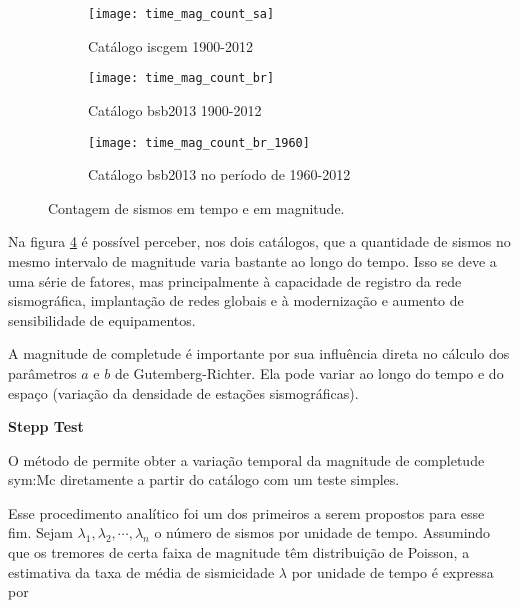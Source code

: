 \begin{figure}[H]
	  \centering
	  \begin{subfigure}[b]{0.7\textwidth}
		  	\centering
			\texttt{[image: time\_mag\_count\_sa]}
			\caption{Catálogo \gls{iscgem} 1900-2012}
			\label{fig:tmf_sa}
        \end{subfigure}%

	  \begin{subfigure}[b]{0.7\textwidth}
		  	\centering
  			\texttt{[image: time\_mag\_count\_br]}
			\caption{Catálogo \gls{bsb2013} 1900-2012}
			\label{fig:tmf_br}
       \end{subfigure}%

	   \begin{subfigure}[b]{0.7\textwidth}
		  	\centering
  			\texttt{[image: time\_mag\_count\_br\_1960]}
			\caption{Catálogo \gls{bsb2013} no período de 1960-2012}
			\label{fig:tmf_br_1960}
       \end{subfigure}%

  \caption{Contagem de sismos em tempo e em magnitude.}
  \label{fig:qc_time_mag_count} 
\end{figure}

Na figura \ref{fig:qc_time_mag_count} é possível perceber, nos dois catálogos,
que a quantidade de sismos no mesmo intervalo de magnitude varia bastante ao longo do tempo.
Isso se deve a uma série de fatores, mas principalmente à capacidade de registro
da rede sismográfica, implantação de redes globais e 
à modernização e aumento de sensibilidade de equipamentos.

A magnitude de completude é importante \citep{woessner_2005} por sua influência direta no cálculo dos parâmetros $a$ e
$b$ de Gutemberg-Richter.
Ela pode variar ao longo do tempo e do espaço (variação da densidade de estações sismográficas).


\begin{p}
\textbf{Stepp Test}
\end{p}

O método de \citet{stepp_1971} permite obter a variação temporal da magnitude
de completude \gls{sym:Mc} diretamente a partir do catálogo com um teste simples.

Esse procedimento analítico foi um dos primeiros a serem propostos para esse fim.
Sejam $\lambda_1, \lambda_2, \cdots, \lambda_n$ o número de sismos por unidade de tempo.
Assumindo que os tremores de certa faixa de magnitude têm distribuição de Poisson, a estimativa da taxa de
média de sismicidade $\lambda$ por unidade de tempo é expressa por

